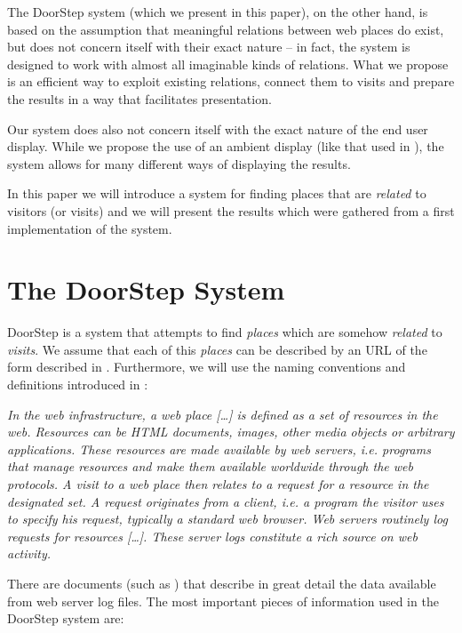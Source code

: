 \documentclass[a4paper,twoside]{danarticle}
\theoremstyle{remark}
\begin{document}
    The DoorStep system (which we present in this paper), 
    on the other hand, is based on the assumption that 
    meaningful relations between web places do exist, but does not concern itself 
    with their exact nature -- in fact, the system is designed 
    to work with almost all imaginable kinds of relations. What we propose is an 
    efficient way to exploit existing relations, connect them to visits 
    and prepare the results in a way that facilitates presentation.
    
    Our system does also not concern itself with the exact 
    nature of the end user display. While we propose the use of an ambient 
    display (like that used in \cite{ambient}), the system allows for many 
    different ways of displaying the results.
    
    In this paper we will introduce a system for finding places that are 
    \textit{related} to
    visitors (or visits) and we will present the results which were gathered 
    from a first implementation of the system.
  \section{The DoorStep System}
    DoorStep is a system that attempts to find \textit{places} which are somehow
    \textit{related} to \textit{visits}. We assume that each
    of this \textit{places} can be described by an URL of the form described in
    \cite{url}. Furthermore, we will use the naming conventions and definitions
    introduced in \cite{webaware}:
    \begin{center}
    \begin{minipage}{10cm}
    \itshape
    In the web infrastructure, a web place [\dots] is defined as 
    a set of resources in the web. Resources can
    be HTML documents, images, other media objects or arbitrary applications.
    These resources are made available by web servers, i.e. programs that manage
    resources and make them available worldwide through the web protocols. A
    visit to a web place then relates to a request for a resource in the
    designated set. A request originates from a client, i.e. a program the
    visitor uses to specify his request, typically a standard web browser. Web
    servers routinely log requests for resources [\dots]. These server logs
    constitute a rich source on web activity.
    \end{minipage}
    \end{center}
    There are documents (such as \cite{logfile}) that describe in great detail 
    the data available from web server log files. The most important pieces of
    information used in the DoorStep system are:
    \\
    
\end{document}
